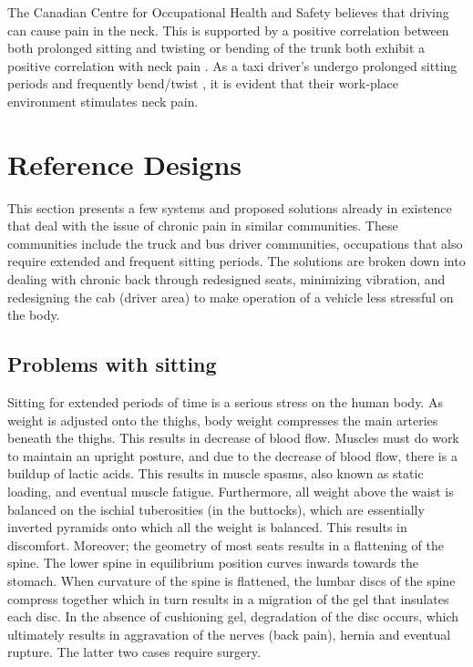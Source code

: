 \documentclass[11pt]{article}
\begin{document}
The Canadian Centre for Occupational Health and Safety believes that driving can cause pain in the 
neck\cite{proof}. This is supported by a positive correlation between both prolonged sitting and 
twisting or bending of the trunk both exhibit a positive correlation with neck pain \cite{neck}. 
As a taxi driver’s undergo prolonged sitting periods and frequently bend/twist \cite{Okunribido2008, POSTUALTED},
it is evident that their work-place environment stimulates neck pain. 

\section{Reference Designs}
\label{sec:designs}

This section presents a few systems and proposed solutions already in existence that deal with the issue of
chronic pain in similar communities. These communities include the truck and bus driver communities, occupations 
that also require extended and frequent sitting periods. The solutions are broken down into dealing with chronic back 
through redesigned seats, minimizing vibration, and redesigning the cab (driver area) to make operation of a vehicle
less stressful on the body.

\subsection{Problems with sitting}
\label{sec:sittingproblems}

Sitting for extended periods of time is a serious stress on the human body. As weight is adjusted
onto the thighs, body weight compresses the main arteries beneath the thighs. This results in 
decrease of blood flow. Muscles must do work to maintain an upright posture, and due to the decrease 
of blood flow, there is a buildup of lactic acids. This results in muscle spasms, also known as static
loading, and eventual muscle fatigue. Furthermore, all weight above the waist is balanced on the ischial 
tuberosities (in the buttocks), which are essentially inverted pyramids onto which all the weight is 
balanced. This results in discomfort. Moreover; the geometry of most seats results in a flattening of the 
spine. The lower spine in equilibrium position curves inwards towards the stomach. When curvature of the 
spine is flattened, the lumbar discs of the spine compress together which in turn results in a migration of 
the gel that insulates each disc. In the absence of cushioning gel, degradation of the disc occurs, which 
ultimately results in aggravation of the nerves (back pain), hernia and eventual rupture. The latter two cases
require surgery\cite{ergoCentricAnatomy2011}.
\end{document}
